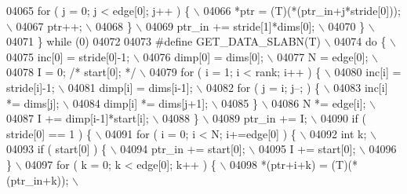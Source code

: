 \begin{DoxyCode}
{{{{{{{{{{{{{{{{{{{{{{{{{04065 \textcolor{preprocessor}{            for ( j = 0; j < edge[0]; j++ ) \{ \(\backslash\)}
04066 \textcolor{preprocessor}{                *ptr = (T)(*(ptr\_in+j*stride[0])); \(\backslash\)}
04067 \textcolor{preprocessor}{                ptr++; \(\backslash\)}
04068 \textcolor{preprocessor}{            \} \(\backslash\)}
04069 \textcolor{preprocessor}{            ptr\_in += stride[1]*dims[0]; \(\backslash\)}
04070 \textcolor{preprocessor}{        \} \(\backslash\)}
04071 \textcolor{preprocessor}{    \} while (0)}
04072 
04073 \textcolor{preprocessor}{#define GET\_DATA\_SLABN(T) \(\backslash\)}
04074 \textcolor{preprocessor}{    do \{ \(\backslash\)}
04075 \textcolor{preprocessor}{        inc[0]  = stride[0]-1; \(\backslash\)}
04076 \textcolor{preprocessor}{        dimp[0] = dims[0]; \(\backslash\)}
04077 \textcolor{preprocessor}{        N       = edge[0]; \(\backslash\)}
04078 \textcolor{preprocessor}{        I       = 0; }\textcolor{comment}{/* start[0]; */}\textcolor{preprocessor}{ \(\backslash\)}
04079 \textcolor{preprocessor}{        for ( i = 1; i < rank; i++ ) \{ \(\backslash\)}
04080 \textcolor{preprocessor}{            inc[i]  = stride[i]-1; \(\backslash\)}
04081 \textcolor{preprocessor}{            dimp[i] = dims[i-1]; \(\backslash\)}
04082 \textcolor{preprocessor}{            for ( j = i; j--; ) \{ \(\backslash\)}
04083 \textcolor{preprocessor}{                inc[i]  *= dims[j]; \(\backslash\)}
04084 \textcolor{preprocessor}{                dimp[i] *= dims[j+1]; \(\backslash\)}
04085 \textcolor{preprocessor}{            \} \(\backslash\)}
04086 \textcolor{preprocessor}{            N *= edge[i]; \(\backslash\)}
04087 \textcolor{preprocessor}{            I += dimp[i-1]*start[i]; \(\backslash\)}
04088 \textcolor{preprocessor}{        \} \(\backslash\)}
04089 \textcolor{preprocessor}{        ptr\_in += I; \(\backslash\)}
04090 \textcolor{preprocessor}{        if ( stride[0] == 1 ) \{ \(\backslash\)}
04091 \textcolor{preprocessor}{            for ( i = 0; i < N; i+=edge[0] ) \{ \(\backslash\)}
04092 \textcolor{preprocessor}{                int k; \(\backslash\)}
04093 \textcolor{preprocessor}{                if ( start[0] ) \{ \(\backslash\)}
04094 \textcolor{preprocessor}{                    ptr\_in += start[0]; \(\backslash\)}
04095 \textcolor{preprocessor}{                    I += start[0]; \(\backslash\)}
04096 \textcolor{preprocessor}{                \} \(\backslash\)}
04097 \textcolor{preprocessor}{                for ( k = 0; k < edge[0]; k++ ) \{ \(\backslash\)}
04098 \textcolor{preprocessor}{                    *(ptr+i+k) = (T)(*(ptr\_in+k)); \(\backslash\)}
}}}}}}}}}}}}}}}}}}}}}}}}}
\end{DoxyCode}

